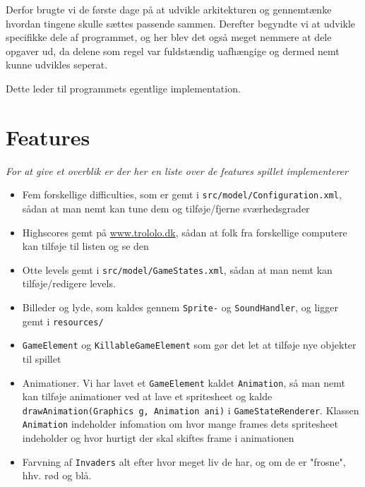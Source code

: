 \documentclass[titlepage,danish]{article}
\newcommand{\code}[1]{\texttt{#1}}
\begin{document}
Derfor brugte vi de første dage på at udvikle arkitekturen og gennemtænke hvordan tingene skulle
sættes passende sammen. Derefter begyndte vi at udvikle specifikke dele af programmet, og her blev
det også meget nemmere at dele opgaver ud, da delene som regel var fuldstændig uafhængige og dermed
nemt kunne udvikles seperat.

Dette leder til programmets egentlige implementation.

\section{Features}
\emph{For at give et overblik er der her en liste over de features spillet implementerer}

\begin{itemize}
\item Fem forskellige difficulties, som er gemt i \code{src/model/Configuration.xml}, sådan at man
  nemt kan tune dem og tilføje/fjerne sværhedsgrader
\item Highscores gemt på \url{www.trololo.dk}, sådan at folk fra
  forskellige computere kan tilføje til listen og se den
\item Otte levels gemt i \code{src/model/GameStates.xml}, sådan at man nemt kan
  tilføje/redigere levels.
\item Billeder og lyde, som kaldes gennem \code{Sprite-} og \code{SoundHandler}, og ligger gemt i \code{resources/}
\item \code{GameElement} og \code{KillableGameElement} som gør det let at tilføje nye objekter til
  spillet
\item Animationer. Vi har lavet et \code{GameElement} kaldet \code{Animation}, så man nemt kan tilføje animationer ved at lave et spritesheet og kalde \code{drawAnimation(Graphics g, Animation
    ani)} i \code{GameStateRenderer}. Klassen \code{Animation} indeholder infomation om hvor mange
  frames dets spritesheet indeholder og hvor hurtigt der skal skiftes frame i animationen
\item Farvning af \code{Invaders} alt efter hvor meget liv de har, og om de er "frosne", hhv. rød og blå.
\end{itemize}
\end{document}
